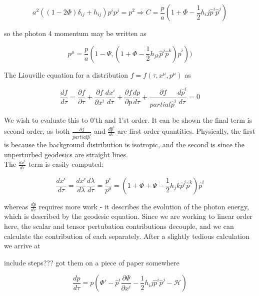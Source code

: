 \documentclass[a4paper,11pt]{article}
\newcommand{\half}{\frac{1}{2}}
\begin{document}
\begin{equation}
a^2((1-2\Phi)\delta_{ij}+h_{ij})p^ip^j = p^2 \Rightarrow C=\frac{p}{a}(1+\Phi-\half h_ij\hat{p}^i\hat{p}^j)
\end{equation}

so the photon 4 momentum may be written as 

\begin{equation}
p^\mu = \frac{p}{a}(1-\Psi, (1+\Phi-\half h_{jk}\hat{p}^j\hat{p}^k)\hat{p}^i))
\end{equation}

The Liouville equation for a distribution $f=f(\tau, x^\mu, p^\mu)$ as

\begin{equation}
\frac{df}{d\tau} = \frac{\partial f}{\partial\tau} + \frac{\partial f}{\partial x^i} \frac{dx^i}{d\tau} + \frac{\partial f}{\partial p} \frac{dp}{d\tau} + \frac{\partial f}{partial\hat{p}^i} \frac{d\hat{p}^i}{d\tau}  = 0
\label{Liouville}
\end{equation}

We wish to evaluate this to 0'th and 1'st order. It can be shown the final term is second order, as both $\frac{\partial f}{partial\hat{p}^i}$ and  $\frac{d\hat{p}^i}{d\tau}$ are first order quantities. Physically, the first is because the background distribution is isotropic, and the second is since the unperturbed geodesics are straight lines. \\

The $\frac{dx^i}{d\tau}$ term is easily computed:

\begin{equation}
\frac{dx^i}{d\tau} = \frac{dx^i}{d\lambda}\frac{d\lambda}{d\tau} = \frac{p^i}{p^0} = (1+\Phi+\Psi-\half h_jk\hat{p}^j\hat{p}^k)\hat{p}^i
\end{equation}

whereas $\frac{dp}{d\tau}$ requires more work - it describes the evolution of the photon energy, which is described by the geodesic equation. Since we are working to linear order here, the scalar and tensor pertubation contributions decouple, and we can calculate the contribution of each separately. After a slightly tedious calculation we arrive at 

include steps??? got them on a piece of paper somewhere

\begin{equation}
\frac{dp}{d\tau} = p (\Phi' - \hat{p}^i\frac{\partial \Psi}{\partial x^i} -\half h_ij\hat{p}^i\hat{p}^j -\mathcal{H})
\end{equation}
\end{document}
